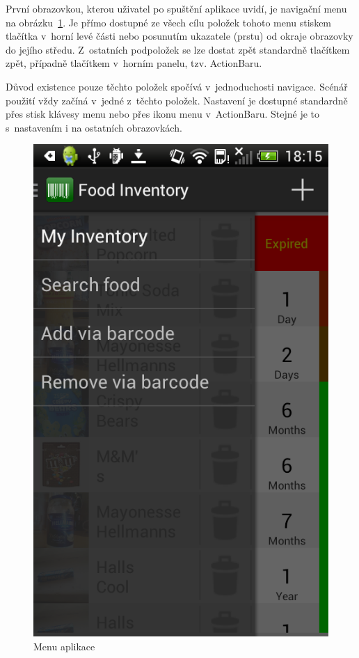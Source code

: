 \documentclass[thesis=B,czech]{FITthesis}[2013/10/20]
\begin{document}
První obrazovkou, kterou uživatel po spuštění aplikace uvidí, je navigační menu na obrázku~\ref{fig:AppMenu}. Je přímo dostupné ze všech cílu položek tohoto menu stiskem tlačítka v~horní levé části nebo posunutím ukazatele (prstu) od okraje obrazovky do jejího středu. Z~ostatních podpoložek se lze dostat zpět standardně tlačítkem zpět, případně tlačítkem v~horním panelu, tzv. ActionBaru.

Důvod existence pouze těchto položek spočívá v~jednoduchosti navigace. Scénář použití vždy začíná v~jedné z~těchto položek. Nastavení je dostupné standardně přes stisk klávesy menu nebo přes ikonu menu v~ActionBaru. Stejné je to s~nastavením i na ostatních obrazovkách.

\begin{figure}[H]
  \centering
  \includegraphics[scale=0.4]{screenshots/app_menu.png}
  \caption{Menu aplikace}
  \label{fig:AppMenu}
\end{figure}
\end{document}
